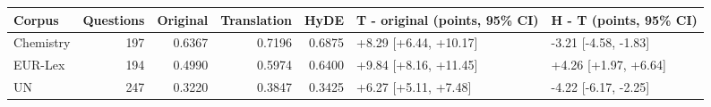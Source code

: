 \begin{tabular}{lrrrrll}
\toprule
Corpus & Questions & Original & Translation & HyDE & T - original (points, 95\% CI) & H - T (points, 95\% CI) \\
\midrule
Chemistry & 197 & 0.6367 & 0.7196 & 0.6875 & +8.29 [+6.44, +10.17] & -3.21 [-4.58, -1.83] \\
EUR-Lex & 194 & 0.4990 & 0.5974 & 0.6400 & +9.84 [+8.16, +11.45] & +4.26 [+1.97, +6.64] \\
UN & 247 & 0.3220 & 0.3847 & 0.3425 & +6.27 [+5.11, +7.48] & -4.22 [-6.17, -2.25] \\
\bottomrule
\end{tabular}
